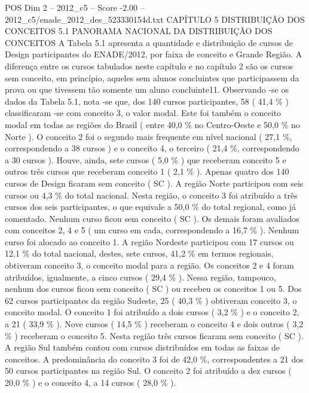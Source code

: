 \begin{textsample}{POS Dim 2 – 2012\_c5 – Score -2.00 – 2012\_c5/enade\_2012\_des\_523330154d.txt}  \label{ex:f2_pos_361}
CAPÍTULO 5 DISTRIBUIÇÃO DOS CONCEITOS 5.1 PANORAMA NACIONAL DA DISTRIBUIÇÃO DOS CONCEITOS A Tabela 5.1 apresenta a quantidade e distribuição de cursos de Design participantes do ENADE/2012, por faixa de conceito e Grande Região.
A diferença entre os cursos tabulados neste capítulo e no capítulo 2 são os cursos sem conceito, em princípio, aqueles sem alunos concluintes que participassem da prova ou que tivessem tão somente um aluno concluinte11.
Observando -se os dados da Tabela 5.1, nota -se que, dos 140 cursos participantes, 58 ( 41,4 \% ) classificaram -se com conceito 3, o valor modal.
Este foi também o conceito modal em todas as regiões do Brasil ( entre 40,0 \% no Centro-Oeste e 50,0 \% no Norte ).
O conceito 2 foi o segundo mais frequente em nível nacional ( 27,1 \%, correspondendo a 38 cursos ) e o conceito 4, o terceiro ( 21,4 \%, correspondendo a 30 cursos ).
Houve, ainda, sete cursos ( 5,0 \% ) que receberam conceito 5 e outros três cursos que receberam conceito 1 ( 2,1 \% ).
Apenas quatro dos 140 cursos de Design ficaram sem conceito ( SC ).
A região Norte participou com seis cursos ou 4,3 \% do total nacional.
Nesta região, o conceito 3 foi atribuído a três cursos dos seis participantes, o que equivale a 50,0 \% do total regional, como já comentado.
Nenhum curso ficou sem conceito ( SC ).
Os demais foram avaliados com conceitos 2, 4 e 5 ( um curso em cada, correspondendo a 16,7 \% ).
Nenhum curso foi alocado ao conceito 1.
A região Nordeste participou com 17 cursos ou 12,1 \% do total nacional, destes, sete cursos, 41,2 \% em termos regionais, obtiveram conceito 3, o conceito modal para a região.
Os conceitos 2 e 4 foram atribuídos, igualmente, a cinco cursos ( 29,4 \% ).
Nessa região, tampouco, nenhum dos cursos ficou sem conceito ( SC ) ou recebeu os conceitos 1 ou 5.
Dos 62 cursos participantes da região Sudeste, 25 ( 40,3 \% ) obtiveram conceito 3, o conceito modal.
O conceito 1 foi atribuído a dois cursos ( 3,2 \% ) e o conceito 2, a 21 ( 33,9 \% ).
Nove cursos ( 14,5 \% ) receberam o conceito 4 e dois outros ( 3,2 \% ) receberam o conceito 5.
Nesta região três cursos ficaram sem conceito ( SC ).
A região Sul também contou com cursos distribuídos em todas as faixas de conceitos.
A predominância do conceito 3 foi de 42,0 \%, correspondentes a 21 dos 50 cursos participantes na região Sul.
O conceito 2 foi atribuído a dez cursos ( 20,0 \% ) e o conceito 4, a 14 cursos ( 28,0 \% ).

\end{textsample}
